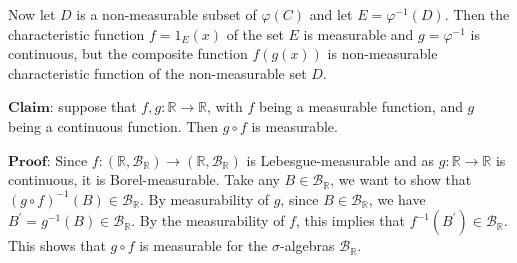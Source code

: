 \documentclass[12pt,a4paper]{ctexart}
\begin{document}
Now let $D$ is a non-measurable subset of $\varphi(C)$ and let $E = \varphi^{-1}(D)$. Then the characteristic function $f = 1_{E}(x)$ of the set $E$ is measurable and $g = \varphi^{-1}$ is continuous, but the composite function $f(g(x))$ is non-measurable characteristic function of the non-measurable set $D$.

$\textbf{Claim:}$ suppose that $f, g: \mathbb{R} \rightarrow \mathbb{R}$, with $f$ being a measurable function, and $g$ being a continuous function. Then $g \circ f$ is measurable.

$\textbf{Proof:}$ Since $f: (\mathbb{R}, \mathcal{B}_{\mathbb{R}}) \rightarrow (\mathbb{R}, \mathcal{B}_{\mathbb{R}})$ is Lebesgue-measurable and as $g: \mathbb{R} \rightarrow \mathbb{R}$ is continuous, it is Borel-measurable. Take any $B \in \mathcal{B}_{\mathbb{R}}$, we want to show that $(g \circ f)^{-1}(B) \in \mathcal{B}_{\mathbb{R}}$. By measurability of $g$, since $B \in \mathcal{B}_{\mathbb{R}}$, we have $B^{'} = g^{-1}(B) \in \mathcal{B}_{\mathbb{R}}$. By the measurability of $f$, this implies that $f^{-1}(B^{'}) \in \mathcal{B}_{\mathbb{R}}$. This shows that $g \circ f$ is measurable for the $\sigma$-algebras $\mathcal{B}_{\mathbb{R}}$.













 
\end{document}
